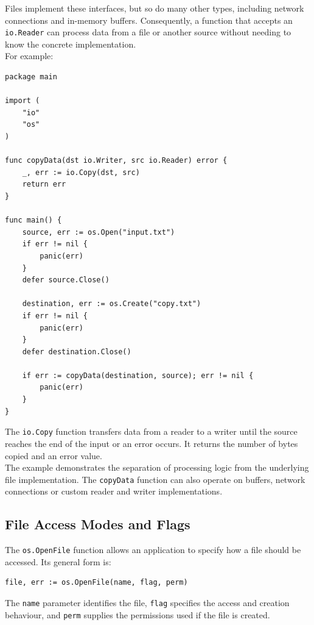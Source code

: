 Files implement these interfaces, but so do many other types, including network connections and in-memory buffers. Consequently, a function that accepts an \texttt{io.Reader} can process data from a file or another source without needing to know the concrete implementation.\\

For example:

\begin{lstlisting}
package main

import (
    "io"
    "os"
)

func copyData(dst io.Writer, src io.Reader) error {
    _, err := io.Copy(dst, src)
    return err
}

func main() {
    source, err := os.Open("input.txt")
    if err != nil {
        panic(err)
    }
    defer source.Close()

    destination, err := os.Create("copy.txt")
    if err != nil {
        panic(err)
    }
    defer destination.Close()

    if err := copyData(destination, source); err != nil {
        panic(err)
    }
}
\end{lstlisting}

The \texttt{io.Copy} function transfers data from a reader to a writer until the source reaches the end of the input or an error occurs. It returns the number of bytes copied and an error value.\\

The example demonstrates the separation of processing logic from the underlying file implementation. The \texttt{copyData} function can also operate on buffers, network connections or custom reader and writer implementations.\\

\subsection{File Access Modes and Flags}

The \texttt{os.OpenFile} function allows an application to specify how a file should be accessed. Its general form is:\\

\begin{lstlisting}
file, err := os.OpenFile(name, flag, perm)
\end{lstlisting}

The \texttt{name} parameter identifies the file, \texttt{flag} specifies the access and creation behaviour, and \texttt{perm} supplies the permissions used if the file is created.\\

